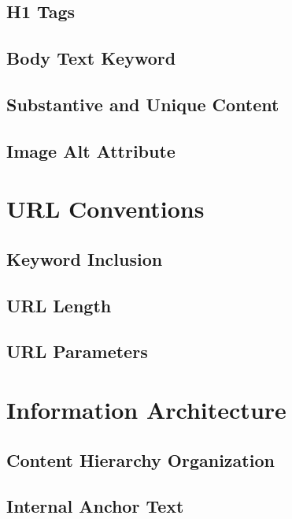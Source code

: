 \documentclass[fleqn,10pt]{SelfArx} %
\begin{document}
\subsection{H1 Tags}

\subsection{Body Text Keyword}

\subsection{Substantive and Unique Content}

\subsection{Image Alt Attribute}

\section{URL Conventions}

\subsection{Keyword Inclusion}


\subsection{URL Length}


\subsection{URL Parameters}

\section{Information Architecture}

\subsection{Content Hierarchy Organization}

\subsection{Internal Anchor Text}
\end{document}

